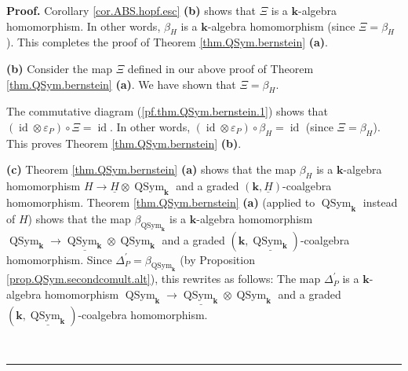 \documentclass
[numbers=enddot,12pt,final,onecolumn,notitlepage,abstracton]{scrartcl}%
\theoremstyle{definition}
\newenvironment{proof}[1][Proof]{\noindent\textbf{#1.} }{\ \rule{0.5em}{0.5em}}
\begin{document}
\begin{proof}
Corollary \ref{cor.ABS.hopf.esc} \textbf{(b)} shows that $\Xi$ is a
$\mathbf{k}$-algebra homomorphism. In other words, $\beta_{H}$ is a
$\mathbf{k}$-algebra homomorphism (since $\Xi=\beta_{H}$). This completes the
proof of Theorem \ref{thm.QSym.bernstein} \textbf{(a)}.

\textbf{(b)} Consider the map $\Xi$ defined in our above proof of Theorem
\ref{thm.QSym.bernstein} \textbf{(a)}. We have shown that $\Xi=\beta_{H}$.

The commutative diagram (\ref{pf.thm.QSym.bernstein.1}) shows that $\left(
\operatorname*{id}\otimes\varepsilon_{P}\right)  \circ\Xi=\operatorname*{id}$.
In other words, $\left(  \operatorname*{id}\otimes\varepsilon_{P}\right)
\circ\beta_{H}=\operatorname*{id}$ (since $\Xi=\beta_{H}$). This proves
Theorem \ref{thm.QSym.bernstein} \textbf{(b)}.

\textbf{(c)} Theorem \ref{thm.QSym.bernstein} \textbf{(a)} shows that the map
$\beta_{H}$ is a $\mathbf{k}$-algebra homomorphism $H\rightarrow
\underline{H}\otimes\operatorname*{QSym}\nolimits_{\mathbf{k}}$ and a graded
$\left(  \mathbf{k},\underline{H}\right)  $-coalgebra homomorphism. Theorem
\ref{thm.QSym.bernstein} \textbf{(a)} (applied to $\operatorname*{QSym}%
\nolimits_{\mathbf{k}}$ instead of $H$) shows that the map $\beta
_{\operatorname*{QSym}\nolimits_{\mathbf{k}}}$ is a $\mathbf{k}$-algebra
homomorphism $\operatorname*{QSym}\nolimits_{\mathbf{k}}\rightarrow
\underline{\operatorname*{QSym}\nolimits_{\mathbf{k}}}\otimes
\operatorname*{QSym}\nolimits_{\mathbf{k}}$ and a graded $\left(
\mathbf{k},\underline{\operatorname*{QSym}\nolimits_{\mathbf{k}}}\right)
$-coalgebra homomorphism. Since $\Delta_{P}^{\prime}=\beta
_{\operatorname*{QSym}\nolimits_{\mathbf{k}}}$ (by Proposition
\ref{prop.QSym.secondcomult.alt}), this rewrites as follows: The map
$\Delta_{P}^{\prime}$ is a $\mathbf{k}$-algebra homomorphism
$\operatorname*{QSym}\nolimits_{\mathbf{k}}\rightarrow
\underline{\operatorname*{QSym}\nolimits_{\mathbf{k}}}\otimes
\operatorname*{QSym}\nolimits_{\mathbf{k}}$ and a graded $\left(
\mathbf{k},\underline{\operatorname*{QSym}\nolimits_{\mathbf{k}}}\right)
$-coalgebra homomorphism.


\end{proof}
\end{document}
